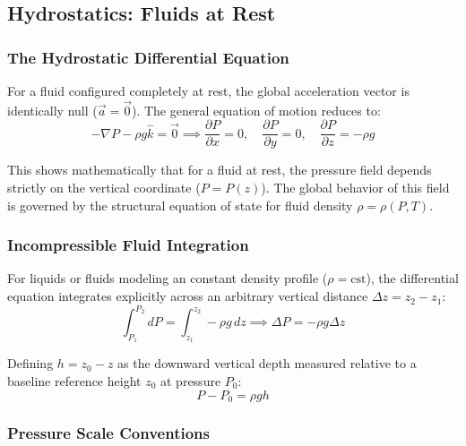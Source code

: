 \subsection{Hydrostatics: Fluids at Rest}

\subsubsection{The Hydrostatic Differential Equation}

For a fluid configured completely at rest, the global acceleration vector is identically null ($\vec{a} = \vec{0}$). The general equation of motion reduces to:
\begin{equation}
    -\nabla P - \rho g \hat{k} = \vec{0} \implies \frac{\partial P}{\partial x} = 0, \quad \frac{\partial P}{\partial y} = 0, \quad \frac{\partial P}{\partial z} = -\rho g
\end{equation}

\begin{expertbox}
This shows mathematically that for a fluid at rest, the pressure field depends strictly on the vertical coordinate ($P = P(z)$). The global behavior of this field is governed by the structural equation of state for fluid density $\rho = \rho(P, T)$.
\end{expertbox}

\subsubsection{Incompressible Fluid Integration}

For liquids or fluids modeling an constant density profile ($\rho = \text{cst}$), the differential equation integrates explicitly across an arbitrary vertical distance $\Delta z = z_2 - z_1$:
\begin{equation}
    \int_{P_1}^{P_2} dP = \int_{z_1}^{z_2} -\rho g \, dz \implies \Delta P = -\rho g \Delta z
\end{equation}

Defining $h = z_0 - z$ as the downward vertical depth measured relative to a baseline reference height $z_0$ at pressure $P_0$:
\begin{equation}
    P - P_0 = \rho g h
\end{equation}

\subsubsection{Pressure Scale Conventions}

